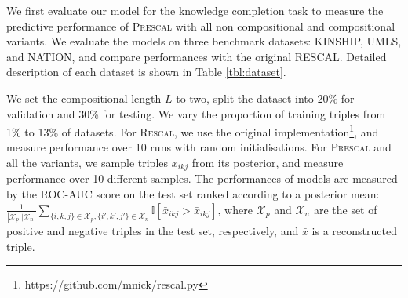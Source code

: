 

We first evaluate our model for the knowledge completion task
to measure the predictive performance of \textsc{Prescal} with all non compositional and compositional variants.
We evaluate the models on three benchmark datasets: KINSHIP, UMLS, and NATION, and compare  performances with the original \textsc{RESCAL}.
Detailed description of each
dataset is shown in Table \ref{tbl:dataset}.

We set the compositional length $L$ to two, split the dataset into 20\% for validation and 30\% for testing. We vary the proportion of training triples
from 1\% to 13\% of datasets. For \textsc{Rescal}, we use the original implementation\footnote{https://github.com/mnick/rescal.py}, and measure performance over 10 runs with random initialisations. For \textsc{Prescal} and all the variants, we sample triples $x_{ikj}$ from its posterior, and measure performance over 10 different samples.
The performances of models are measured by the ROC-AUC score on the test set ranked according to a posterior mean:
$\frac{1}{|\mathcal{X}_p|  |\mathcal{X}_n|} \sum_{\{i,k,j\} \in \mathcal{X}_p, \{i',k',j'\} \in \mathcal{X}_n} \mathbb{I}[\bar{x}_{ikj} > \bar{x}_{ikj}]$,
where $\mathcal{X}_p$ and $\mathcal{X}_n$ are the set of positive and negative triples in the test set, respectively, and $\bar{x}$ is a reconstructed triple.

